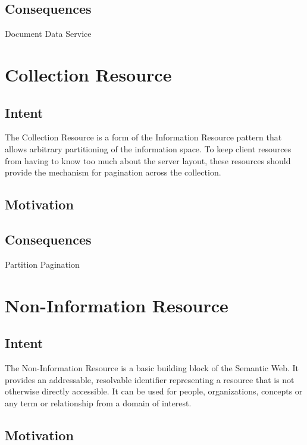 \subsection{Consequences}
\label{ch01.sec.2.consequences}

Document
Data
Service

\newpage
\section{Collection Resource}
\label{ch01.sec.3}

\subsection{Intent}
\label{ch01.sec.3.intent}
The Collection Resource is a form of the Information Resource pattern that allows arbitrary partitioning of the information space. To keep client resources from having to know too much about the server layout, these resources should provide the mechanism for pagination across the collection.

\subsection{Motivation}
\label{ch01.sec.3.motivation}

\subsection{Consequences}
\label{ch01.sec.3.consequences}

Partition
Pagination

\newpage
\section{Non-Information Resource}
\label{ch01.sec.4}

\subsection{Intent}
\label{ch01.sec.4.intent}
The Non-Information Resource is a basic building block of the Semantic Web. It provides an addressable, resolvable identifier representing a resource that is not otherwise directly accessible. It can be used for people, organizations, concepts or any term or relationship from a domain of interest.

\subsection{Motivation}
\label{ch01.sec.4.motivation}

